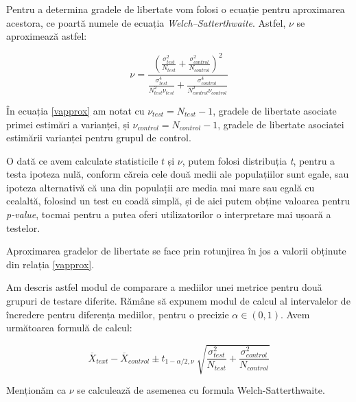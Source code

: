 \vspace{0.8cm}

Pentru a determina gradele de libertate vom folosi o ecuație pentru aproximarea acestora, ce poartă numele de ecuația \textit{Welch–Satterthwaite}. Astfel, $\nu$ se aproximează astfel:

\begin{equation}
\label{vapprox}
\nu = \frac{({\frac{\sigma_{test}^2}{N_{test}} }+ {\frac{\sigma_{control}^2}{N_{control}}}) ^ 2}{
	\frac{\sigma_{test}^4}{N_{test}^2 \nu_{test}} + 
	\frac{\sigma_{control}^4}{N_{control}^2 \nu_{control}}
}
\end{equation}

\vspace{0.8cm}

În ecuația \ref{vapprox} am notat cu $\nu_{test} = N_{test} - 1$, gradele de libertate asociate primei estimări a varianței,  și $\nu_{control} = N_{control} - 1$, gradele de libertate asociatei estimării varianței pentru grupul de control.

O dată ce avem calculate statisticile $t$ și $\nu$, putem folosi distribuția \textit{t}, pentru a testa ipoteza nulă, conform căreia cele două medii ale populațiilor sunt egale, sau ipoteza alternativă că una din populații are media mai mare sau egală cu cealaltă, folosind un test cu coadă simplă, și de aici putem obține valoarea pentru \textit{p-value}, tocmai pentru a putea oferi utilizatorilor o interpretare mai ușoară a testelor. \cite{Welch1947}

\begin{remark}
	Aproximarea gradelor de libertate se face prin rotunjirea în jos a valorii obținute din relația \ref{vapprox}.
\end{remark}

Am descris astfel modul de comparare a mediilor unei metrice pentru două grupuri de testare diferite. Rămâne să expunem modul de calcul al intervalelor de încredere pentru diferența mediilor, pentru o precizie $\alpha \in (0, 1)$. Avem următoarea formulă de calcul: \cite{miao}

\begin{equation}
\overline{X}_{text} - \overline{X}_{control} \pm t_{1 - \alpha/2, \nu} \
\sqrt{ {\frac{\sigma_{test}^2}{N_{test}} }+ {\frac{\sigma_{control}^2}{N_{control}}}}
\end{equation}

\vspace{0.8cm}

Menționăm ca $\nu$ se calculează de asemenea cu formula Welch-Satterthwaite.

